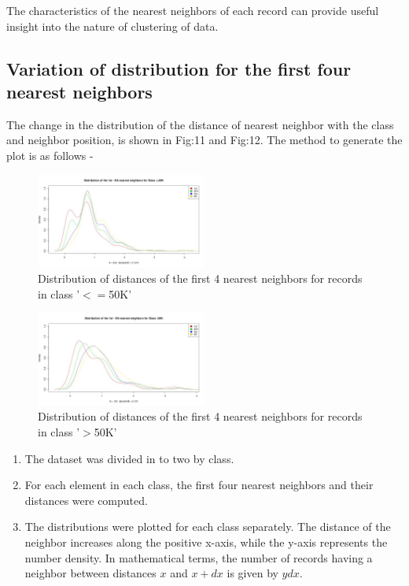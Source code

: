 The characteristics of the nearest neighbors of each record can provide useful insight into the nature of clustering of data.

\subsection{Variation of distribution for the first four nearest neighbors}
The change in the distribution of the distance of nearest neighbor with the class and neighbor position, is shown in Fig:11 and Fig:12. The method to generate the plot is as follows - 
\begin{figure}[h]
		\label{fig:proximity-distribution-class1}
		\caption{Distribution of distances of the first 4 nearest neighbors for records in class '$<=$50K'}
		\centering
		\includegraphics[width=0.5\textwidth]{images/proximity-distribution-class1.jpg}
\end{figure}
\begin{figure}[h]
		\label{fig:proximity-distribution-class2}
		\caption{Distribution of distances of the first 4 nearest neighbors for records in class '$>$50K'}
		\centering
		\includegraphics[width=0.5\textwidth]{images/proximity-distribution-class2.jpg}
\end{figure}

\begin{enumerate}
\item The dataset was divided in to two by class.
\item For each element in each class, the first four nearest neighbors and their distances were computed.
\item The distributions were plotted for each class separately. The distance of the neighbor increases along the positive x-axis, while the y-axis represents the number density. In mathematical terms, the number of records having a neighbor between distances $x$ and $x+dx$ is given by $ydx$.
\end{enumerate}

